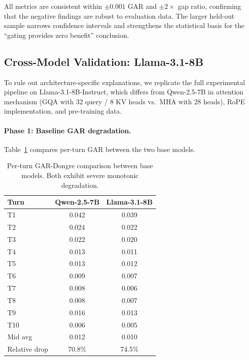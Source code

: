 \documentclass[11pt,a4paper]{article}
\newcommand{\gar}{\textsc{GAR}}
\begin{document}
All metrics are consistent within $\pm 0.001$ \gar{} and $\pm 2\times$ gap ratio, confirming that the negative findings are robust to evaluation data.
The larger held-out sample narrows confidence intervals and strengthens the statistical basis for the ``gating provides zero benefit'' conclusion.

\subsection{Cross-Model Validation: Llama-3.1-8B}
\label{sec:cross-model}

To rule out architecture-specific explanations, we replicate the full experimental pipeline on Llama-3.1-8B-Instruct, which differs from Qwen-2.5-7B in attention mechanism (GQA with 32 query / 8 KV heads vs.\ MHA with 28 heads), RoPE implementation, and pre-training data.

\paragraph{Phase 1: Baseline \gar{} degradation.}
Table~\ref{tab:phase1-crossmodel} compares per-turn \gar{} between the two base models.

\begin{table}[H]
\centering
\caption{Per-turn \gar{}-Dongre comparison between base models. Both exhibit severe monotonic degradation.}
\label{tab:phase1-crossmodel}
\begin{tabular}{lcc}
\toprule
\textbf{Turn} & \textbf{Qwen-2.5-7B} & \textbf{Llama-3.1-8B} \\
\midrule
T1  & 0.042 & 0.039 \\
T2  & 0.024 & 0.022 \\
T3  & 0.022 & 0.020 \\
T4  & 0.013 & 0.011 \\
T5  & 0.013 & 0.012 \\
T6  & 0.009 & 0.007 \\
T7  & 0.008 & 0.006 \\
T8  & 0.008 & 0.007 \\
T9  & 0.016 & 0.013 \\
T10 & 0.006 & 0.005 \\
\midrule
Mid avg       & 0.012 & 0.010 \\
Relative drop & 70.8\% & 74.5\% \\
\bottomrule
\end{tabular}
\end{table}
\end{document}
